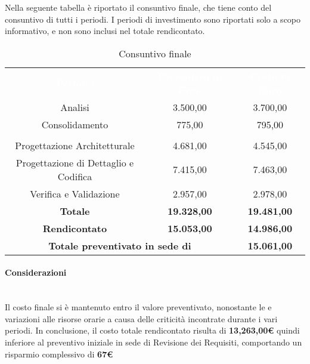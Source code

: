 Nella seguente tabella è riportato il consuntivo finale, che tiene conto del consuntivo di tutti i periodi. I periodi di investimento sono riportati solo a scopo informativo, e non sono inclusi nel totale rendicontato.

\begin{table}[H]
	\centering
	\begin{tabular}{ccc}
	\rowcolor{greySWEight}
	\textcolor{white}{\textbf{Periodo}} &
	\textcolor{white}{\textbf{Preventivo in Euro}} & 
	\textcolor{white}{\textbf{Costo in Euro}} \\
	Analisi & 3.500,00 & 3.700,00 \\
	Consolidamento & 775,00 & 795,00 \\
	\rowcolor{greySWEight}
	\multicolumn{3}{c}{ \textcolor{white}{\textbf{Rendicontato}} } \\
	Progettazione Architetturale & 4.681,00 & 4.545,00 \\
	Progettazione di Dettaglio e Codifica & 7.415,00 & 7.463,00 \\
	Verifica e Validazione & 2.957,00 & 2.978,00 \\
	\textbf{Totale} & \textbf{19.328,00} & \textbf{19.481,00} \\
	\textbf{Rendicontato} & \textbf{15.053,00} & \textbf{14.986,00} \\
	\multicolumn{2}{c}{\textbf{Totale preventivato in sede di \RR{}} } & \textbf{15.061,00} \\
	\end{tabular}
	\caption{Consuntivo finale}
\end{table}
\paragraph{Considerazioni}\mbox{}\\
Il costo finale si è mantenuto entro il valore preventivato, nonostante le e variazioni alle risorse orarie a causa delle criticità incontrate durante i vari periodi.
In conclusione, il costo totale rendicontato risulta di \textbf{13,263,00\euro{}} quindi inferiore al preventivo iniziale in sede di Revisione dei Requisiti, comportando un risparmio complessivo di \textbf{67\euro{}}
